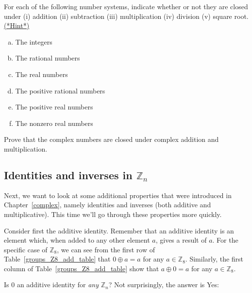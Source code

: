 \begin{exercise}{53}
For each of the following number systems, indicate whether or not they are closed under (i) addition (ii) subtraction (iii) multiplication (iv) division (v) square root.
\hyperref[sec:modular_arithmetic:hints]{(*Hint*)}  
\begin{multicols}{2}
\begin{enumerate}[(a)]
\item
The integers 
\item
The rational numbers
\item
The real numbers
\item
The positive rational numbers
\item
The positive real numbers
\item
The nonzero real numbers
\end{enumerate}
\end{multicols}
\end{exercise}

\begin{exercise}{54}
Prove that the complex numbers are closed under complex addition and multiplication.
\end{exercise}

\subsection{Identities and inverses in ${\mathbb Z}_n$}
Next, we want to look at some additional properties that were introduced in Chapter~\ref{complex}, namely 
 identities  and inverses (both additive and multiplicative).  
This time we'll go through these properties more quickly.

Consider first the additive identity. Remember that an additive identity is an element which, when added to any other element $a$, gives a result of $a$.  For the specific case of ${\mathbb Z}_8$, we can see from the first row of Table~\ref{groups_Z8_add_table} that 
$0 \oplus a = a $ for any $a \in {\mathbb Z}_8$. Similarly, the first column of Table~\ref{groups_Z8_add_table} show that $a \oplus 0 = a$ for any $a \in {\mathbb Z}_8$. 

Is 0 an additive identity for \emph{any} ${\mathbb Z}_n$? Not surprisingly, the answer is Yes:


